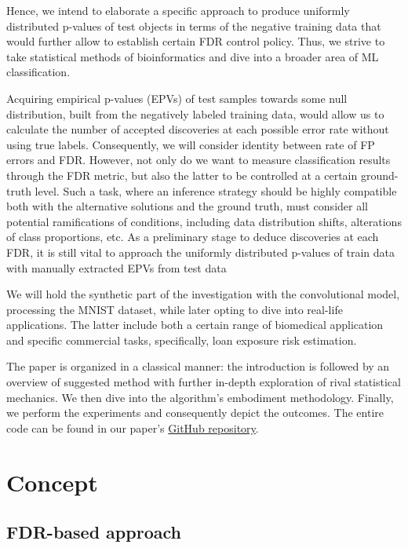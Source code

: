 \documentclass{article}
\begin{document}
Hence, we intend to elaborate a specific approach to produce uniformly distributed p-values of test objects in terms of the negative training data that would further allow to establish certain FDR control policy. Thus, we strive to take statistical methods of bioinformatics and dive into a broader area of ML classification.

Acquiring empirical p-values (EPVs) of test samples towards some null distribution, built from the negatively labeled training data, would allow us to calculate the number of accepted discoveries at each possible error rate without using true labels. Consequently, we will consider identity between rate of FP errors and FDR. However, not only do we want to measure classification results through the FDR metric, but also the latter to be controlled at a certain ground-truth level. Such a task, where an inference strategy should be highly compatible both with the alternative solutions and the ground truth, must consider all potential ramifications of conditions, including data distribution shifts, alterations of class proportions, etc. As a preliminary stage to deduce discoveries at each FDR, it is still vital to approach the uniformly distributed p-values of train data with manually extracted EPVs from test data 

We will hold the synthetic part of the investigation with the convolutional model, processing the MNIST dataset, while later opting to dive into real-life applications. The latter include both a certain range of biomedical application and specific commercial tasks,  specifically, loan exposure risk estimation.

The paper is organized in a classical manner: the introduction is followed by an overview of suggested method with further in-depth exploration of rival  statistical mechanics.  We then dive into the algorithm's embodiment methodology.  Finally, we perform the experiments and consequently depict the outcomes. The entire code can be found in our paper’s \href{https://github.com/Aborevsky01/pvalues_classification}{GitHub repository}.

\section{Concept}

\subsection{FDR-based approach}
\end{document}
